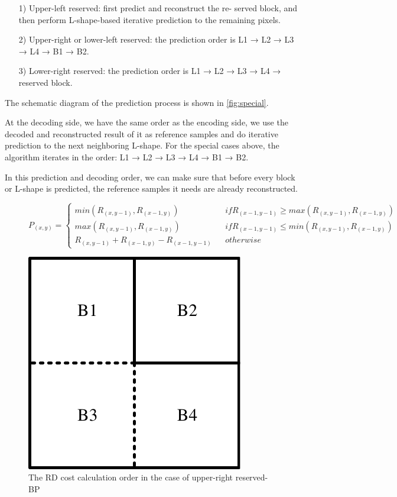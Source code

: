 \documentclass[journal]{IEEEtran}
\begin{document}
\begin{itemize}
\item [1)]
Upper-left reserved: first predict and reconstruct the re- served block, and then perform L-shape-based iterative prediction to the remaining pixels.
\item [2)]
Upper-right or lower-left reserved: the prediction order is L1 → L2 → L3 → L4 → B1 → B2.
\item [3)]
Lower-right reserved: the prediction order is L1 → L2 → L3 → L4 → reserved block.
\end{itemize}
The schematic diagram of the prediction process is shown in \autoref{fig:special}. 

At the decoding side, we have the same order as the encoding side, we use the decoded and reconstructed result of it as reference samples and do iterative prediction to the next neighboring L-shape. For the special cases above, the algorithm iterates in the order: L1 → L2 → L3 → L4 → B1 → B2.

In this prediction and decoding order, we can make sure that before every block or L-shape is predicted, the reference samples it needs are already reconstructed.

\begin{figure}[htbp]
\begin{equation}
P_{(x,y)}=\left\{
\begin{aligned}
min(R_{(x,y-1)},R_{(x-1,y)})&      & if R_{(x-1,y-1)} \geq max(R_{(x,y-1)},R_{(x-1,y)}) \\
max(R_{(x,y-1)},R_{(x-1,y)})&      & if R_{(x-1,y-1)} \leq min(R_{(x,y-1)},R_{(x-1,y)}) \\
R_{(x,y-1)}+R_{(x-1,y)}-R_{(x-1,y-1)}   &      & otherwise
\end{aligned}
\right. 
\label{planar}
\end{equation}
\end{figure}


\begin{figure}[htpb]
\centering
\includegraphics[width=4 cm]{pictures/optimization}
\caption{The RD cost calculation order in the case of upper-right reserved-BP}
\label{fig:optimization}
\end{figure}
\end{document}
